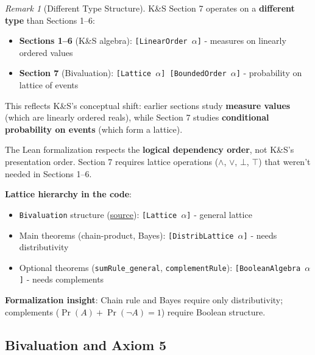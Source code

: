 \documentclass[11pt]{article}
\theoremstyle{definition}
\theoremstyle{remark}
\newtheorem{remark}[theorem]{Remark}
\begin{document}
\begin{remark}[Different Type Structure]
K\&S Section 7 operates on a \textbf{different type} than Sections 1--6:

\begin{itemize}
\item \textbf{Sections 1--6} (K\&S algebra): \texttt{[LinearOrder $\alpha$]} - measures on linearly ordered values
\item \textbf{Section 7} (Bivaluation): \texttt{[Lattice $\alpha$] [BoundedOrder $\alpha$]} - probability on lattice of events
\end{itemize}

This reflects K\&S's conceptual shift: earlier sections study \textbf{measure values} (which are linearly ordered reals), while Section 7 studies \textbf{conditional probability on events} (which form a lattice).

The Lean formalization respects the \textbf{logical dependency order}, not K\&S's presentation order. Section 7 requires lattice operations ($\wedge$, $\vee$, $\bot$, $\top$) that weren't needed in Sections 1--6.

\textbf{Lattice hierarchy in the code}:
\begin{itemize}
\item \texttt{Bivaluation} structure (\href{https://github.com/zariuq/ks-foundations-of-inference/blob/main/KnuthSkilling/Probability/ConditionalProbability/Basic.lean}{source}): \texttt{[Lattice $\alpha$]} - general lattice
\item Main theorems (chain-product, Bayes): \texttt{[DistribLattice $\alpha$]} - needs distributivity
\item Optional theorems (\texttt{sumRule\_general}, \texttt{complementRule}): \texttt{[BooleanAlgebra $\alpha$]} - needs complements
\end{itemize}

\textbf{Formalization insight}: Chain rule and Bayes require only distributivity; complements ($\Pr(A) + \Pr(\neg A) = 1$) require Boolean structure.
\end{remark}

\subsection{Bivaluation and Axiom 5}
\end{document}
